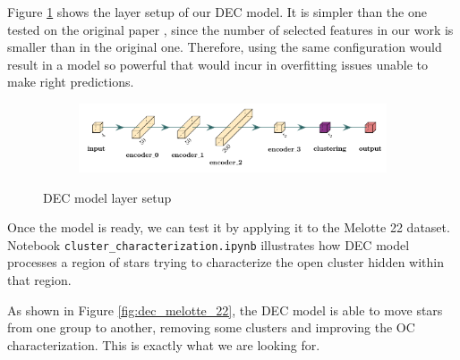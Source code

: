\documentclass[11pt, a4paper, english]{book}
\begin{document}
Figure \ref{fig:dec_model_setup} shows the layer setup of our DEC model.
It is simpler than the one tested on the original paper \cite{xie2016unsupervised},
since the number of selected features in our work is smaller than in the original one.
Therefore, using the same configuration would result in a model so
powerful that would incur in overfitting issues unable to make right predictions.

\begin{figure}[htbp]
  \centering
  \begin{subfigure}{0.9\textwidth}
    \centering
    \includegraphics[width=\textwidth]{../figures/dec_diagram.pdf}
  \end{subfigure}
  \caption{DEC model layer setup}
  \label{fig:dec_model_setup}
\end{figure}

Once the model is ready, we can test it by applying it to the Melotte 22 dataset.
Notebook \verb|cluster_characterization.ipynb| illustrates how DEC model processes a region of stars
trying to characterize the open cluster hidden within that region.

As shown in Figure \ref{fig:dec_melotte_22},
the DEC model is able to move stars from one group to another,
removing some clusters and improving the OC characterization.
This is exactly what we are looking for.
\end{document}
